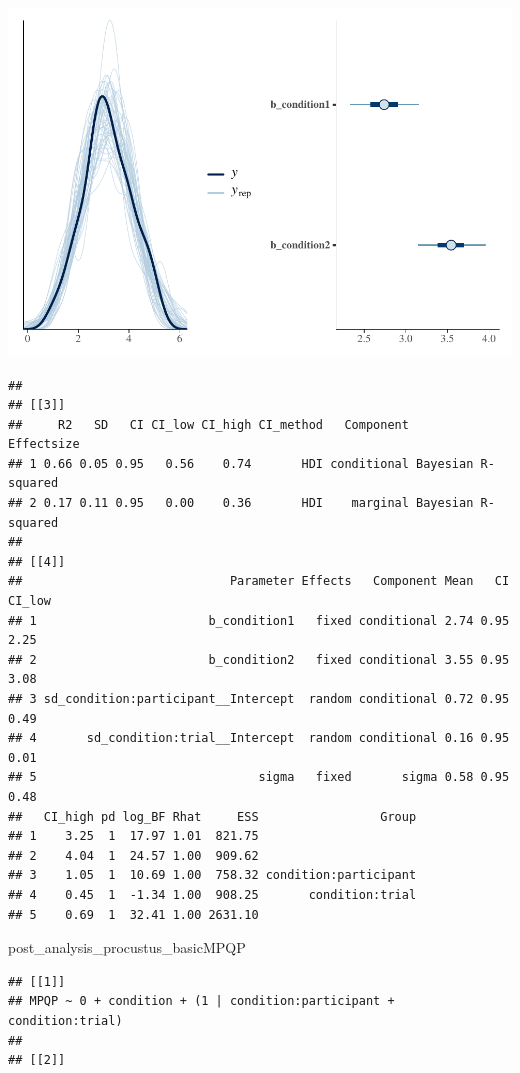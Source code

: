 \documentclass[
]{article}
\newenvironment{Shaded}{\begin{snugshade}}{\end{snugshade}}
\newcommand{\NormalTok}[1]{#1}
\begin{document}
\includegraphics{06_Publish_GUSO_ASIL_files/figure-latex/DiagnosticsQ-2.pdf}

\begin{verbatim}
## 
## [[3]]
##     R2   SD   CI CI_low CI_high CI_method   Component         Effectsize
## 1 0.66 0.05 0.95   0.56    0.74       HDI conditional Bayesian R-squared
## 2 0.17 0.11 0.95   0.00    0.36       HDI    marginal Bayesian R-squared
## 
## [[4]]
##                             Parameter Effects   Component Mean   CI CI_low
## 1                        b_condition1   fixed conditional 2.74 0.95   2.25
## 2                        b_condition2   fixed conditional 3.55 0.95   3.08
## 3 sd_condition:participant__Intercept  random conditional 0.72 0.95   0.49
## 4       sd_condition:trial__Intercept  random conditional 0.16 0.95   0.01
## 5                               sigma   fixed       sigma 0.58 0.95   0.48
##   CI_high pd log_BF Rhat     ESS                 Group
## 1    3.25  1  17.97 1.01  821.75                      
## 2    4.04  1  24.57 1.00  909.62                      
## 3    1.05  1  10.69 1.00  758.32 condition:participant
## 4    0.45  1  -1.34 1.00  908.25       condition:trial
## 5    0.69  1  32.41 1.00 2631.10
\end{verbatim}

\begin{Shaded}
\begin{Highlighting}[]
\NormalTok{post\_analysis\_procustus\_basicMPQP}
\end{Highlighting}
\end{Shaded}

\begin{verbatim}
## [[1]]
## MPQP ~ 0 + condition + (1 | condition:participant + condition:trial) 
## 
## [[2]]
\end{verbatim}
\end{document}

